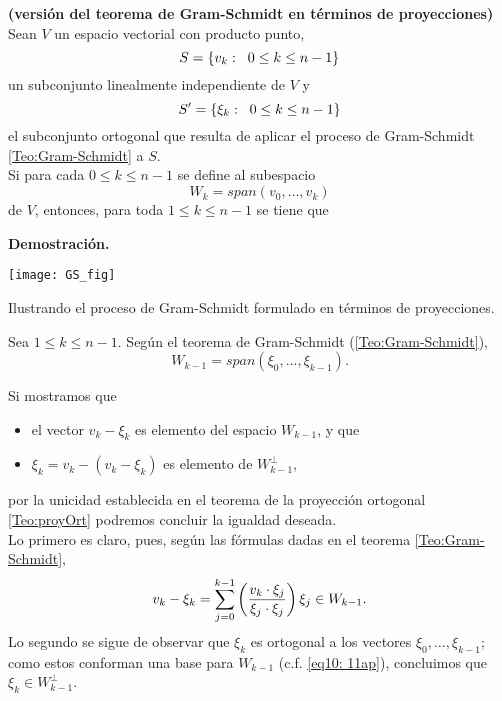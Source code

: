 \begin{prop} \label{Prop:Gram-Schmidt2}
\textbf{(versión del teorema de Gram-Schmidt en términos de
proyecciones)}
Sean $V$ un espacio vectorial con producto punto,
\[
S=\{ v_{k} : \hspace{0.2cm} 0 \leq k \leq n-1 \}
\] un subconjunto
linealmente independiente de $V$ y
\[
S' =\{ \xi_{k} : \hspace{0.2cm} 0 \leq k \leq n-1 \}
\] el subconjunto
ortogonal que resulta de aplicar el proceso de
Gram-Schmidt \ref{Teo:Gram-Schmidt} a $S$. \\

Si para cada $0 \leq k \leq n-1$ se define al subespacio
\[
W_{k}= span(v_{0}, \ldots , v_{k}) 
\]
de $V$, entonces, para toda $1 \leq k \leq n-1$
se tiene que 
\begin{center}
\end{center}
\end{prop}
\noindent
\textbf{Demostración.}

\begin{marginfigure}
\texttt{[image: GS\_fig]} 
		\caption{Ilustrando el proceso de Gram-Schmidt formulado 
		en términos de proyecciones.}
\end{marginfigure}

\noindent
Sea $1 \leq k \leq n-1$.
Según el teorema de Gram-Schmidt (\ref{Teo:Gram-Schmidt}),
\begin{equation}
\label{eq10: 11ap}
W_{k-1}=span(\xi_{0}, \ldots , \xi_{k-1}).
\end{equation}


Si mostramos que
\begin{itemize}
	\item el vector $v_{k}-\xi_{k}$ es elemento
	del espacio $W_{k-1}$, y que
	\item $\xi_{k}=v_{k}-(v_{k}-\xi_{k})$
	es elemento de $W_{k-1}^{\perp}$,
\end{itemize}
por la unicidad establecida en
el teorema de la proyección ortogonal \ref{Teo:proyOrt}
podremos concluir la igualdad deseada. \\
Lo primero es claro, pues, según las fórmulas
dadas en el teorema \ref{Teo:Gram-Schmidt},
\[
v_{k}-\xi_{k}= 
\sum\limits_{j=0}^{k-1}
\left( \frac{v_{k} \cdot \xi_{j}}{\xi_{j} \cdot \xi_{j}} \right) \xi_{j} \in W_{k-1}.
\]
Lo segundo se sigue de observar que
$\xi_{k}$ es ortogonal a los vectores $\xi_{0}, \ldots , \xi_{k-1}$;
como estos conforman una base para $W_{k-1}$
(c.f. \eqref{eq10: 11ap}), concluimos
que $\xi_{k} \in W_{k-1}^{\perp}$.

